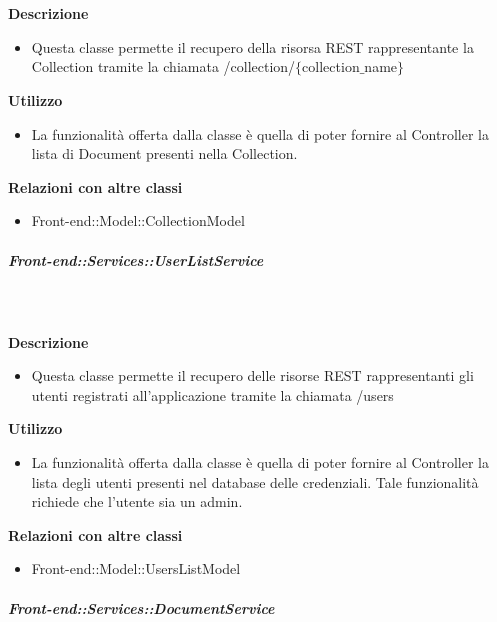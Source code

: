 \begin{itemize}
        \textbf{\\ \\ Descrizione} 
          \begin{itemize}
            \item[] Questa classe permette il recupero della risorsa REST rappresentante la Collection tramite la chiamata  /collection/$\{$collection$\_$name$\}$
          \end{itemize}      
        \textbf{Utilizzo}  
          \begin{itemize}
            \item[] La  funzionalità offerta dalla classe è quella di poter fornire al Controller la lista di Document presenti nella Collection.
          \end{itemize}
          \textbf{Relazioni con altre classi}
          \begin{itemize}
              \item{Front-end::Model::CollectionModel}
          \end{itemize}
      \subparagraph{Front-end::Services::UserListService}
        
        \textbf{\\ \\ Descrizione} 
          \begin{itemize}
            \item[] Questa classe permette il recupero delle risorse REST rappresentanti gli utenti registrati all'applicazione tramite la chiamata /users
          \end{itemize}      
        \textbf{Utilizzo}  
          \begin{itemize}
            \item[] La funzionalità offerta dalla classe è quella di poter fornire al Controller la lista degli utenti presenti nel database delle credenziali.
Tale funzionalità richiede che l'utente sia un admin.
          \end{itemize}
          \textbf{Relazioni con altre classi}
          \begin{itemize}
              \item{Front-end::Model::UsersListModel}
          \end{itemize}
      \subparagraph{Front-end::Services::DocumentService}
        

\end{itemize}

